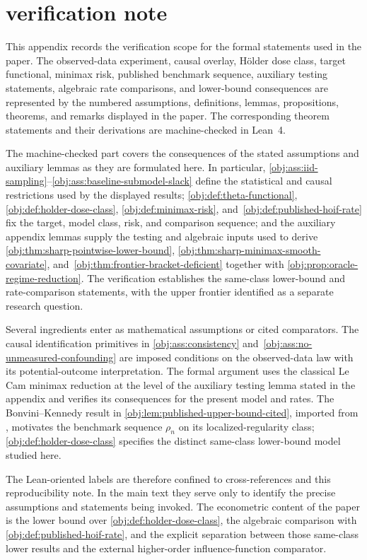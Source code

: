 \section{verification note}

This appendix records the verification scope for the formal statements used in the paper. The observed-data experiment, causal overlay, Hölder dose class, target functional, minimax risk, published benchmark sequence, auxiliary testing statements, algebraic rate comparisons, and lower-bound consequences are represented by the numbered assumptions, definitions, lemmas, propositions, theorems, and remarks displayed in the paper. The corresponding theorem statements and their derivations are machine-checked in Lean~4.

The machine-checked part covers the consequences of the stated assumptions and auxiliary lemmas as they are formulated here. In particular, \cref{obj:ass:iid-sampling}--\cref{obj:ass:baseline-submodel-slack} define the statistical and causal restrictions used by the displayed results; \cref{obj:def:theta-functional}, \cref{obj:def:holder-dose-class}, \cref{obj:def:minimax-risk}, and~\cref{obj:def:published-hoif-rate} fix the target, model class, risk, and comparison sequence; and the auxiliary appendix lemmas supply the testing and algebraic inputs used to derive \cref{obj:thm:sharp-pointwise-lower-bound}, \cref{obj:thm:sharp-minimax-smooth-covariate}, and~\cref{obj:thm:frontier-bracket-deficient} together with \cref{obj:prop:oracle-regime-reduction}. The verification establishes the same-class lower-bound and rate-comparison statements, with the upper frontier identified as a separate research question.

Several ingredients enter as mathematical assumptions or cited comparators. The causal identification primitives in \cref{obj:ass:consistency} and~\cref{obj:ass:no-unmeasured-confounding} are imposed conditions on the observed-data law with its potential-outcome interpretation. The formal argument uses the classical Le Cam minimax reduction at the level of the auxiliary testing lemma stated in the appendix and verifies its consequences for the present model and rates. The Bonvini--Kennedy result in \cref{obj:lem:published-upper-bound-cited}, imported from \citet{bonvini2022}, motivates the benchmark sequence \(\rho_n\) on its localized-regularity class; \cref{obj:def:holder-dose-class} specifies the distinct same-class lower-bound model studied here.

The Lean-oriented labels are therefore confined to cross-references and this reproducibility note. In the main text they serve only to identify the precise assumptions and statements being invoked. The econometric content of the paper is the lower bound over \cref{obj:def:holder-dose-class}, the algebraic comparison with \cref{obj:def:published-hoif-rate}, and the explicit separation between those same-class lower results and the external higher-order influence-function comparator.
